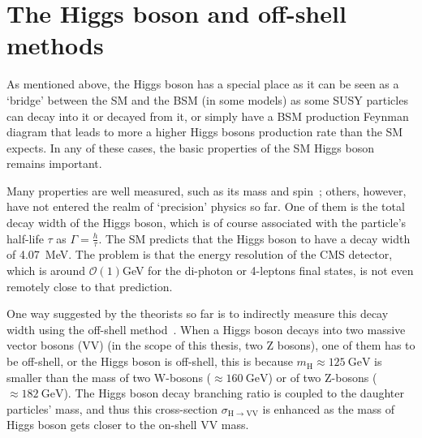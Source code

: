 \section{The Higgs boson and off-shell methods}\label{sec:physics_offshell}


As mentioned above, the Higgs boson has a special place as it can be seen as a `bridge' between
the SM and the BSM (in some models) as some SUSY particles can decay into it or decayed from it, 
or simply have a BSM production Feynman diagram that leads to more a higher Higgs
bosons production rate than the SM expects. In any of these cases, the basic properties of the SM Higgs
boson remains important.



Many properties are well measured, such as its mass and spin~\cite{cms_higgs}; others, however,
have not entered the realm of `precision' physics so far. One of them is the total decay width of
the Higgs boson, which is of course associated with the particle's half-life $\tau$ as $\Gamma=\frac{h}{\tau}$.
The SM predicts
that the Higgs boson to have a decay width of \SI{4.07}{\mega\electronvolt}. The problem is
that the energy resolution of the CMS detector, which is around $\mathcal{O}(1) $\si{\giga\electronvolt}
for the di-photon or 4-leptons final states, is not even remotely close to that prediction.

One way suggested by the theorists so far is to indirectly measure this decay width using the
off-shell method~\cite{offshell_theory1, offshell_theory2}. When a Higgs boson decays into two massive
vector bosons (VV) (in the scope of this thesis, two Z bosons),
one of them has to be off-shell, or the Higgs boson is off-shell, this is because
$m_\text{H}\approx\SI{125}{\giga\electronvolt}$ is smaller than the 
mass of two W-bosons ($\approx\SI{160}{\giga\electronvolt}$) 
or of two Z-bosons ($\approx\SI{182}{\giga\electronvolt}$). The Higgs boson decay branching ratio
is coupled to the daughter particles' mass, and thus this cross-section
$\sigma_{\mathrm{H}\rightarrow\mathrm{VV}}$ is enhanced as the mass of Higgs boson gets closer to 
the on-shell VV mass.  

